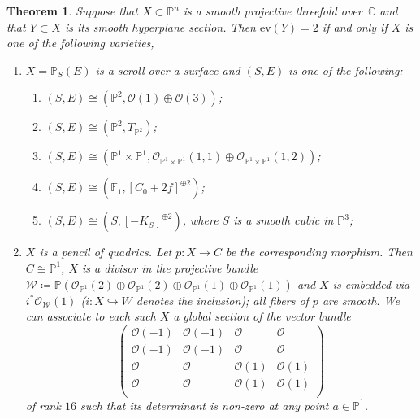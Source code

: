 \documentclass[a4paper]{amsart}
\theoremstyle{plain}
\newtheorem{theorem}{Theorem}[section]
\theoremstyle{definition}
\begin{document}
\begin{theorem}
Suppose that $X\subset \mathbb P^n$ is a smooth projective threefold
over~$\mathbb C$ and that $Y\subset X$ is its smooth hyperplane
section. Then $\mathrm{ev}(Y)=2$ if and only if $X$ is one of the
following varieties,

\begin{enumerate}
    \item $X = \mathbb P_S(E)$ is a scroll over a surface and $(S, E)$ is one of the following:
    \begin{enumerate}
        \item $(S, E) \cong (\mathbb P^2, \mathcal O(1)\oplus \mathcal O(3))$;
        \item $(S, E) \cong (\mathbb P^2, T_{\mathbb P^2})$;
        \item $(S, E) \cong (\mathbb P^1 \times \mathbb P^1, \mathcal O_{\mathbb P^1 \times \mathbb P^1}(1,1)\oplus  \mathcal O_{\mathbb P^1 \times \mathbb P^1}(1,2))$;
        \item $(S, E) \cong (\mathbb F_1, [C_0 + 2f]^{\oplus 2})$;
        \item $(S, E) \cong (S, [-K_S]^{\oplus 2})$, where $S$ is a smooth cubic in $\mathbb P^3$;
    \end{enumerate}
    \item $X$ is a pencil of quadrics. Let $p\colon X \to C$ be the corresponding morphism. Then $C \cong \mathbb P^1$, $X$ is a divisor in the projective bundle $\mathcal W \coloneqq \mathbb P(\mathcal O_{\mathbb P^1}(2) \oplus \mathcal O_{\mathbb P^1}(2) \oplus \mathcal O_{\mathbb P^1}(1) \oplus \mathcal O_{\mathbb P^1}(1))$
    and $X$ is embedded via $i^*\mathcal O_{\mathcal W} (1)$ ($i \colon X \hookrightarrow W$ denotes the inclusion); all fibers of $p$ are smooth.
    We can associate to each such $X$ a global section of the vector bundle
    \begin{equation*}
        \begin{pmatrix}
            \mathcal O(-1)&\mathcal O(-1)&\mathcal O    &\mathcal O    \\
            \mathcal O(-1)&\mathcal O(-1)&\mathcal O    &\mathcal O    \\
            \mathcal O   &\mathcal O   &\mathcal O(1)&\mathcal O(1)\\
            \mathcal O   &\mathcal O   &\mathcal O(1)&\mathcal O(1)\\
        \end{pmatrix}
    \end{equation*}
    of rank $16$ such that its determinant is non-zero at any point $a \in \mathbb P^1$.
\end{enumerate}
\end{theorem}
\end{document}
